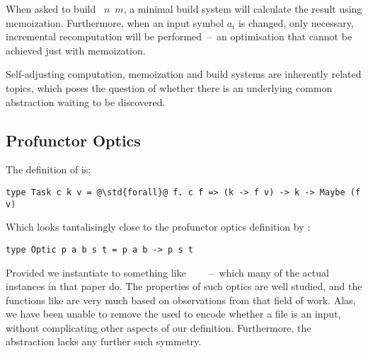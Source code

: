 \noindent
When asked to build ~$n$~$m$, a minimal build system will calculate the
result using memoization. Furthermore, when an input symbol $a_i$ is changed,
only necessary, incremental recomputation will be performed~--~an optimisation
that cannot be achieved just with memoization.

Self-adjusting computation, memoization and build systems are inherently related
topics, which poses the question of whether there is an underlying common
abstraction waiting to be discovered.

\subsection{Profunctor Optics}\label{sec-related-optics}

The definition of  is:

\begin{verbatim}
type Task c k v = @\std{forall}@ f. c f => (k -> f v) -> k -> Maybe (f v)
\end{verbatim}

\noindent
Which looks tantalisingly close to the profunctor optics definition by
\cite{pickering2017profunctor}:

\begin{verbatim}
type Optic p a b s t = p a b -> p s t
\end{verbatim}

Provided we instantiate  to something like
~\hs{->}~~~--~which many of the actual instances in that paper
do. The properties of such optics are well studied, and the functions like
 are very much based on observations from that field of work.
Alas, we have been unable to remove the  used to encode whether a file
is an input, without complicating other aspects of our definition. Furthermore,
the  abstraction lacks any further such symmetry.
